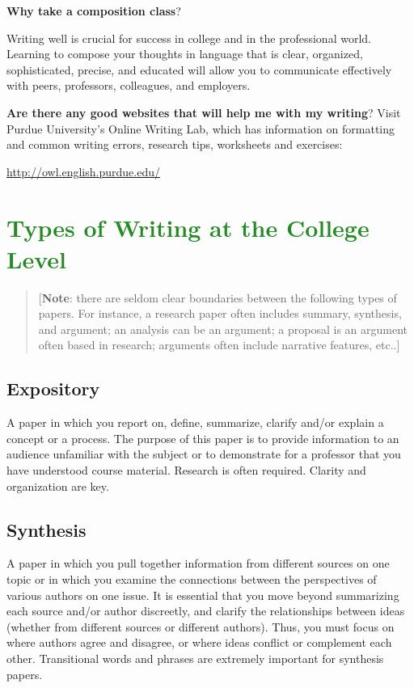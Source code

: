 \documentclass[12pt, hidelinks]{article} %
\begin{document}
\textbf{Why take a composition class}?

Writing well is crucial for success in college and in the professional world. Learning to compose your thoughts in language that is clear, organized, sophisticated, precise, and educated will allow you to communicate effectively with peers, professors, colleagues, and employers.


\textbf{Are there any good websites that will help me with my writing}?
Visit Purdue University's Online Writing Lab, which has information on formatting and common writing errors, research tips, worksheets and exercises:

\url{http://owl.english.purdue.edu/} 



\section{\textcolor{ForestGreen}{Types of Writing at the College Level}}

\begin{quote} [\textbf{Note}: there are seldom clear boundaries between the following types of papers. For instance, a research paper often includes summary, synthesis, and argument; an analysis can be an argument; a proposal is an argument often based in research; arguments often include narrative features, etc..] \end{quote}


\subsection{Expository}
A paper in which you report on, define, summarize, clarify and/or explain a concept or a process. The purpose of this paper is to provide information to an audience unfamiliar with the subject or to demonstrate for a professor that you have understood course material.  Research is often required. Clarity and organization are key.

\subsection{Synthesis}

A paper in which you pull together information from different sources on one topic or in which you examine the connections between the perspectives of various authors on one issue. It is essential that you move beyond summarizing each source and/or author discreetly, and clarify the relationships between ideas (whether from different sources or different authors). Thus, you must focus on where authors agree and disagree, or where ideas conflict or complement each other. Transitional words and phrases are extremely important for synthesis papers.
\end{document}
